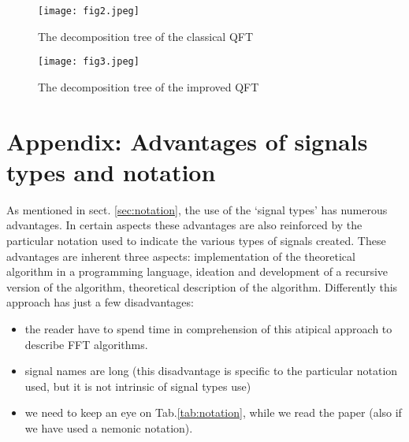 \documentclass[a4paper,10pt]{article}
\begin{document}
\begin{figure}[htb]
  \centering
  \texttt{[image: fig2.jpeg]}
  \caption{The decomposition tree of the classical QFT}
  \label{fig:classical_qft}
\end{figure}





\begin{figure}[htb]
  \centering
  \texttt{[image: fig3.jpeg]}
  \caption{The decomposition tree of the improved QFT}
  \label{fig:improved_qft}
\end{figure}









\appendix



\begingroup
{}

\section*{Appendix: Advantages of signals types and notation} \label{sec:appendice}
 
As mentioned in sect. \ref{sec:notation}, the use of the `signal types' has numerous advantages.
In certain aspects these advantages are also reinforced by the particular notation used to indicate the various types of signals created.
These advantages are inherent three aspects: implementation of the theoretical algorithm in a programming language,  ideation and development of a recursive version of the algorithm, theoretical description of the algorithm.
Differently this approach has just a few disadvantages:
\begin{itemize}

\item
the reader have to spend time in comprehension of this atipical approach to describe FFT algorithms.

\item 
signal names are long (this disadvantage is specific to the particular notation used, but it is not intrinsic of signal types use)

\item
we need to keep an eye on Tab.\ref{tab:notation}, while we read the paper (also if we have used a nemonic notation).

\end{itemize}
\end{document}
